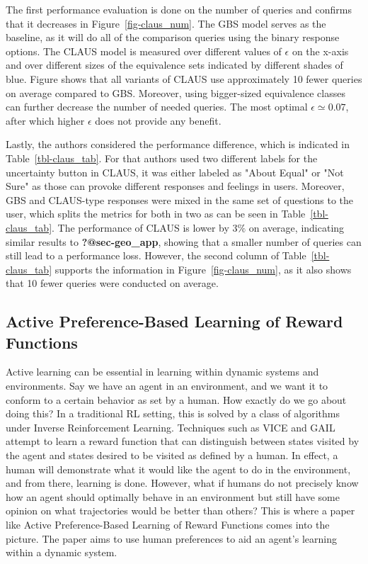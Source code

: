 \documentclass[
  letterpaper,
  numbers=noenddot,
  DIV=11]{scrreprt}
\theoremstyle{definition}
\theoremstyle{plain}
\theoremstyle{plain}
\theoremstyle{remark}
\begin{document}
The first performance evaluation is done on the number of queries and
confirms that it decreases in Figure~\ref{fig-claus_num}. The GBS model
serves as the baseline, as it will do all of the comparison queries
using the binary response options. The CLAUS model is measured over
different values of \(\epsilon\) on the x-axis and over different sizes
of the equivalence sets indicated by different shades of blue. Figure
shows that all variants of CLAUS use approximately 10 fewer queries on
average compared to GBS. Moreover, using bigger-sized equivalence
classes can further decrease the number of needed queries. The most
optimal \(\epsilon \simeq 0.07\), after which higher \(\epsilon\) does
not provide any benefit.

Lastly, the authors considered the performance difference, which is
indicated in Table~\ref{tbl-claus_tab}. For that authors used two
different labels for the uncertainty button in CLAUS, it was either
labeled as "About Equal" or "Not Sure" as those can provoke different
responses and feelings in users. Moreover, GBS and CLAUS-type responses
were mixed in the same set of questions to the user, which splits the
metrics for both in two as can be seen in Table~\ref{tbl-claus_tab}. The
performance of CLAUS is lower by \(3\%\) on average, indicating similar
results to \textbf{?@sec-geo\_app}, showing that a smaller number of
queries can still lead to a performance loss. However, the second column
of Table~\ref{tbl-claus_tab} supports the information in
Figure~\ref{fig-claus_num}, as it also shows that 10 fewer queries were
conducted on average.

\subsection{Active Preference-Based Learning of Reward
Functions}\label{active-preference-based-learning-of-reward-functions}

Active learning can be essential in learning within dynamic systems and
environments. Say we have an agent in an environment, and we want it to
conform to a certain behavior as set by a human. How exactly do we go
about doing this? In a traditional RL setting, this is solved by a class
of algorithms under Inverse Reinforcement Learning. Techniques such as
VICE and GAIL attempt to learn a reward function that can distinguish
between states visited by the agent and states desired to be visited as
defined by a human. In effect, a human will demonstrate what it would
like the agent to do in the environment, and from there, learning is
done. However, what if humans do not precisely know how an agent should
optimally behave in an environment but still have some opinion on what
trajectories would be better than others? This is where a paper like
Active Preference-Based Learning of Reward Functions comes into the
picture. The paper aims to use human preferences to aid an agent's
learning within a dynamic system.
\end{document}
